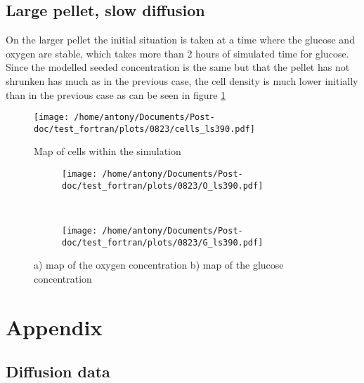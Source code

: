 \documentclass[11pt,a4paper]{article}
\begin{document}
\subsection{Large pellet, slow diffusion}
On the larger pellet the initial situation is taken at a time where the glucose and oxygen are stable, which takes  more than 2 hours of simulated time for glucose. Since the modelled seeded concentration is the same but that the pellet has not shrunken has much as in the previous case, the cell density is much lower initially than in the previous case as can be seen in figure \ref{cells_ls390}    \\

\begin{figure}[ht!]
\begin{center}
\texttt{[image: /home/antony/Documents/Post-doc/test\_fortran/plots/0823/cells\_ls390.pdf]}
\caption{Map of cells within the simulation \label{cells_ls390}}
\end{center}
\end{figure}

\begin{figure}[ht!]
	\begin{subfigure}{0.45\textwidth}
	\centering
	\texttt{[image: /home/antony/Documents/Post-doc/test\_fortran/plots/0823/O\_ls390.pdf]}
	\caption{ }
	\end{subfigure}
	~~ \hspace{1cm}
	\begin{subfigure}{0.45\textwidth}
	\texttt{[image: /home/antony/Documents/Post-doc/test\_fortran/plots/0823/G\_ls390.pdf]}
		\caption{ }
	\end{subfigure}
	\caption{a) map of the oxygen concentration b)  map of the glucose concentration\label{OG_ls30}}
	\end{figure}

\section*{Appendix}


\subsection{Diffusion data}
\end{document}
